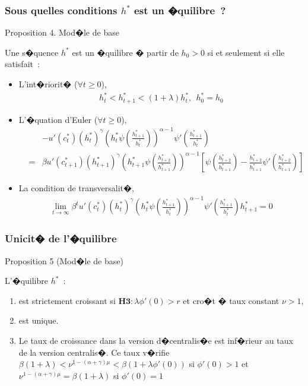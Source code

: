 \documentclass[10pt, hyperref={pdfpagemode=FullScreen}]{beamer} %
\begin{document}
\begin{frame}
\frametitle{Sous quelles conditions $h^{*}$ est un �quilibre~?}
\begin{block}{Proposition 4. Mod�le de base \hyperlink{annexe4part1}{}}\label{proposition4}
\scriptsize{
Une s�quence $h^{*}$ est un �quilibre � partir de $h_{0}>0$ si et seulement si elle satisfait~: 
\begin{itemize}
\item<+-> L'int�riorit� ($\forall t\geq 0$),
\begin{eqnarray*}
h_{t}^{*} < h_{t+1}^{*} < (1+\lambda)h_{t}^{*},\  \  h_{0}^{*}=h_{0} 
\end{eqnarray*}
\item<+-> L'�quation d'Euler ($\forall t\geq 0$),
\begin{eqnarray*}
&&-u'(c_{t}^{*})(h_{t}^{*})^{\gamma}(h_{t}^{*}\psi(\frac{h_{t+1}^{*}}{h_{t}^{*}}))^{\alpha-1} \psi'(\frac{h_{t+1}^{*}}{h_{t}^{*}}) \\
&=& \beta u'(c_{t+1}^{*})(h_{t+1}^{*})^{\gamma}(h_{t+1}^{*}\psi(\frac{h_{t+2}^{*}}{h_{t+1}^{*}}))^{\alpha-1}[\psi(\frac{h_{t+2}^{*}}{h_{t+1}^{*}})-\frac{h_{t+2}^{*}}{h_{t+1}^{*}}\psi'(\frac{h_{t+2}^{*}}{h_{t+1}^{*}})]
\end{eqnarray*}
\item<+->  La condition de transversalit�,
\begin{eqnarray*}
\lim_{t\rightarrow\infty} \beta^{t} u'(c_{t}^{*})(h_{t}^{*})^{\gamma}(h_{t}^{*}\psi(\frac{h_{t+1}^{*}}{h_{t}^{*}}))^{\alpha-1}\psi'(\frac{h_{t+1}^{*}}{h_{t}^{*}})h_{t+1}^{*} = 0 
\end{eqnarray*}
\end{itemize}
}
\end{block}
\end{frame}


\begin{frame}
\frametitle{Unicit� de l'�quilibre}
\begin{block}{Proposition 5 (Mod�le de base)}\label{proposition5}
\scriptsize{
L'�quilibre $h^{*}$~: 
\begin{enumerate}
\item est strictement croissant si $\mathbf{H3 : }  \lambda\phi'(0)>r$ et cro�t � taux constant $\nu>1$, 
\item est unique.
\item Le taux de croissance dans la version d�centralis�e est inf�rieur au taux de la version centralis�. Ce taux v�rifie $\beta(1+\lambda)<\nu^{1-(\alpha+\gamma)\mu}<\beta(1+\lambda\phi'(0))$ si $\phi'(0)>1$ et $\nu^{1-(\alpha+\gamma)\mu}=\beta(1+\lambda)$ si $\phi'(0)=1$
\end{enumerate}
}
\end{block}
\end{frame}
\end{document}
